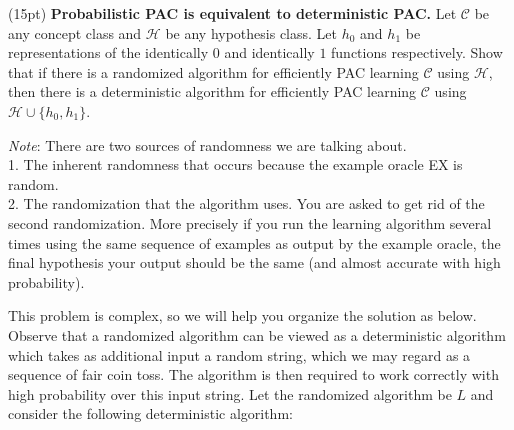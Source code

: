 \documentclass[11pt]{article}
\newcommand*{\C}{{\mathcal C}}
\newcommand*{\Hp}{{\mathcal H}}
\DeclareMathOperator{\1}{\mathbbm{1}}
\begin{document}
\begin{problem} (15pt) \textbf{Probabilistic PAC is equivalent to deterministic PAC.} Let $\C$ be any concept class and $\Hp$ be any hypothesis class. Let $h_0$ and
$h_1$ be representations of the identically $0$ and identically $1$ functions
respectively. Show that if there is a randomized algorithm for efficiently PAC
learning $\C$ using $\Hp$, then there is a deterministic algorithm for
efficiently PAC learning $\C$ using $\Hp \cup \{h_0, h_1 \}$. 

\emph{Note}: There are two sources of randomness we are talking about. \\
1. The inherent randomness that occurs because the example oracle EX is random.
\\
2. The randomization that the algorithm uses. You are asked to get rid of the
second randomization. More precisely if you run the learning algorithm several
times using the same sequence of examples as output by the example oracle, the
final hypothesis your output should be the same (and almost accurate with high
probability).

This problem is complex, so we will help you organize the solution as below. 
Observe that a randomized algorithm can be viewed as a deterministic
algorithm which takes as additional input a random string, which we may regard
as a sequence of fair coin toss. The algorithm is then
required to work correctly with high probability over this input string. 
Let the randomized algorithm be $L$ and consider the following deterministic 
algorithm:
\begin{center}
\end{center}


\end{problem}
\end{document}
